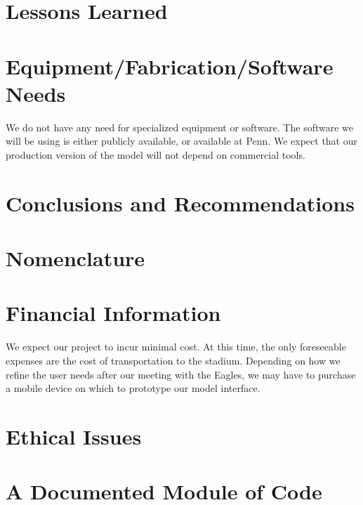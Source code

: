 \documentclass[12pt]{article}
\begin{document}


\section{Lessons Learned}



\section{Equipment/Fabrication/Software Needs}
We do not have any need for specialized equipment or software. The
software we will be using is either publicly available, or available
at Penn. We expect that our production version of the model will not
depend on commercial tools.

\section{Conclusions and Recommendations}



\section{Nomenclature}



\makereferences

\makebibliography


\section{Financial Information}
We expect our project to incur minimal cost. At this time, the only
foreseeable expenses are the cost of transportation to the
stadium. Depending on how we refine the user needs after our meeting
with the Eagles, we may have to purchase a mobile device on which to
prototype our model interface.

\section{Ethical Issues}



\appendix

\section{A Documented Module of Code}

\end{document}
